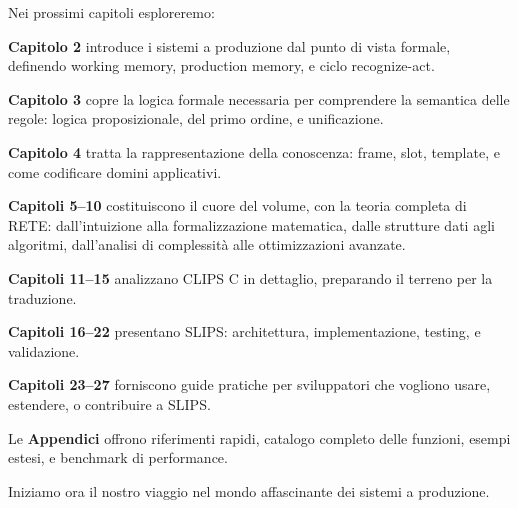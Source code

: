 Nei prossimi capitoli esploreremo:

\textbf{Capitolo 2} introduce i sistemi a produzione dal punto di vista formale, definendo working memory, production memory, e ciclo recognize-act.

\textbf{Capitolo 3} copre la logica formale necessaria per comprendere la semantica delle regole: logica proposizionale, del primo ordine, e unificazione.

\textbf{Capitolo 4} tratta la rappresentazione della conoscenza: frame, slot, template, e come codificare domini applicativi.

\textbf{Capitoli 5--10} costituiscono il cuore del volume, con la teoria completa di RETE: dall'intuizione alla formalizzazione matematica, dalle strutture dati agli algoritmi, dall'analisi di complessità alle ottimizzazioni avanzate.

\textbf{Capitoli 11--15} analizzano CLIPS C in dettaglio, preparando il terreno per la traduzione.

\textbf{Capitoli 16--22} presentano SLIPS: architettura, implementazione, testing, e validazione.

\textbf{Capitoli 23--27} forniscono guide pratiche per sviluppatori che vogliono usare, estendere, o contribuire a SLIPS.

Le \textbf{Appendici} offrono riferimenti rapidi, catalogo completo delle funzioni, esempi estesi, e benchmark di performance.

\vspace{1cm}

Iniziamo ora il nostro viaggio nel mondo affascinante dei sistemi a produzione.


